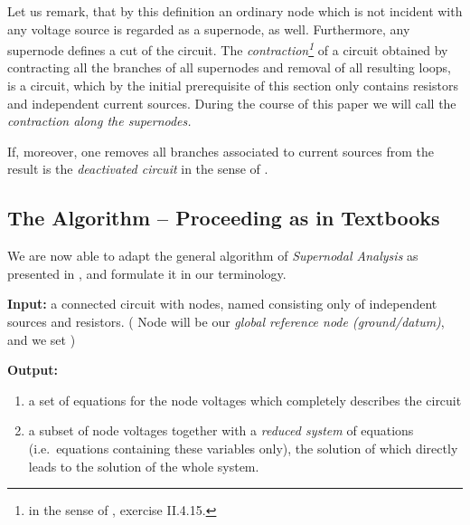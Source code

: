 \documentclass[10pt,journal,twocolumn,pagenumbers]{IEEEtran}
\begin{document}
\smallskip
Let us remark, that by this definition an ordinary node which is not incident with any voltage source is regarded as a supernode, as well. Furthermore, any super\-node defines a cut of the circuit. The {\em contraction\footnote
{in the sense of \cite{Bollobas}, exercise II.4.15.}
}  of a circuit  obtained by contracting all the branches of all supernodes and removal of all resulting loops, is a circuit, which by the initial prerequisite of this section only contains resistors and independent current sources. During the course of this paper we will call  the {\em contraction along the supernodes.}

If, moreover, one removes all branches associated to current sources from  the result is the {\em deactivated circuit} in the sense of \cite{ChenDavis,Davis}.

\subsection{The Algorithm -- Proceeding as in Textbooks}

We are now able to adapt the general algorithm of {\em Super\-nodal Analysis} as presented in \cite{SommerSuper,ChenDavis,Davis}, and formulate it in our terminology.

\medskip
\noindent
{\bf Input:} a connected circuit  with  nodes, named   consisting only of independent sources and resistors. 
( Node  will be our {\em global reference node (ground/datum)}, and we set    )

\smallskip
\noindent
{\bf Output:} 
\begin{enumerate}
\item a set of equations for the node voltages   which completely describes the circuit 
\item a subset of node voltages together with a {\em reduced system} of equations (i.e.\ equations containing these variables only), the solution of which directly leads to the solution of the whole system. 
\end{enumerate}
 
\end{document}
